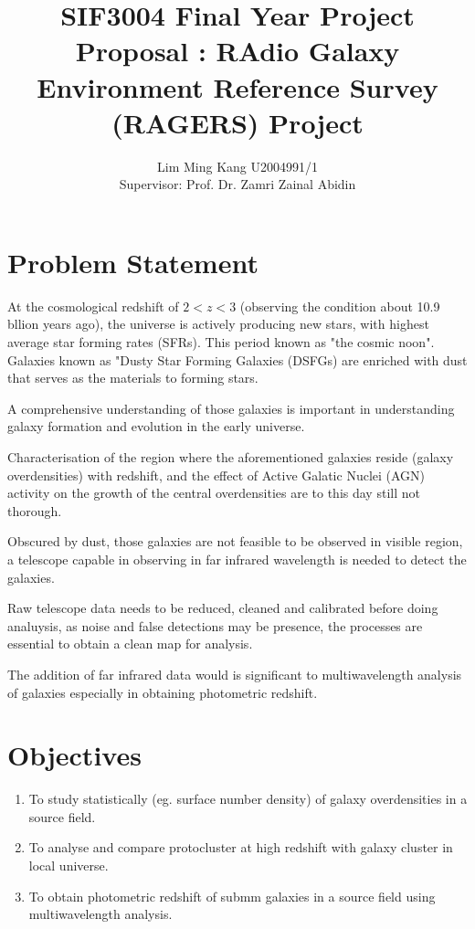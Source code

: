 \documentclass{article}
\title{SIF3004 Final Year Project Proposal : RAdio Galaxy Environment Reference Survey (RAGERS) Project }
\author{Lim Ming Kang U2004991/1\\[0.3cm]{Supervisor: Prof. Dr. Zamri Zainal Abidin}}
\begin{document}
\maketitle
\section{Problem Statement}

At the cosmological redshift of $2 < z < 3$ (observing the condition about 10.9 bllion years ago), the universe is actively producing new stars, with highest average star forming rates (SFRs). This period known as "the cosmic noon"\parencite{Schreiber2020}. Galaxies known as "Dusty Star Forming Galaxies (DSFGs) are enriched with dust that serves as the materials to forming stars.
\medskip

\noindent A comprehensive understanding of those galaxies is important in understanding galaxy formation and evolution in the early universe.\parencite{Geach2016}
\medskip

\noindent Characterisation of the region where the aforementioned galaxies reside (galaxy overdensities) with redshift, and the effect of Active Galatic Nuclei (AGN) activity on the growth of the central overdensities are to this day still not thorough.\parencite{ragers2021}
\medskip

\noindent Obscured by dust, those galaxies are not feasible to be observed in visible region, a telescope capable in observing in far infrared wavelength is needed to detect the galaxies.
\medskip

\noindent Raw telescope data needs to be reduced, cleaned and calibrated before doing analuysis, as noise and false detections may be presence, the processes are essential to obtain a clean map for analysis. 

\medskip

\noindent The addition of far infrared data would is significant to multiwavelength analysis of galaxies especially in obtaining photometric redshift.

\section{Objectives}
\begin{enumerate}
    \item To study statistically (eg. surface number density) of galaxy overdensities in a source field.
    \item To analyse and compare protocluster at high redshift with galaxy cluster in local universe.
    \item To obtain photometric redshift of submm galaxies in a source field using multiwavelength analysis.
\end{enumerate}
\end{document}
